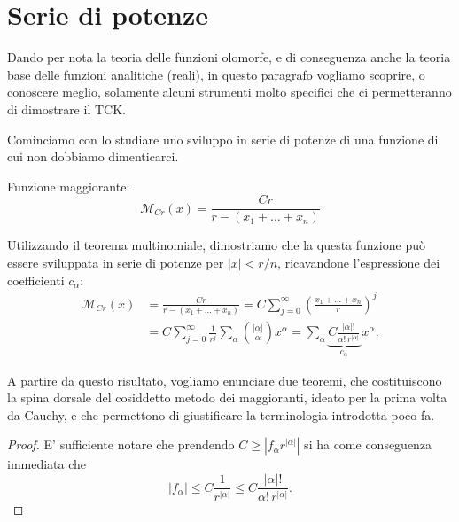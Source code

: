 \newpage
\section{Serie di potenze}\label{seriedipotenze}
Dando per nota la teoria delle funzioni olomorfe, e di conseguenza anche la teoria base delle funzioni analitiche (reali), in questo paragrafo vogliamo scoprire, o conoscere meglio, solamente alcuni strumenti molto specifici che ci permetteranno di dimostrare il TCK.

Cominciamo con lo studiare uno sviluppo in serie di potenze di una funzione di cui non dobbiamo dimenticarci.
\begin{definition}
Funzione maggiorante: $$\mathcal{M}_{Cr}(x)=\frac{Cr}{r-(x_1+\ldots +x_n)}$$
\end{definition}
Utilizzando il teorema multinomiale, dimostriamo che la questa funzione può essere sviluppata in serie di potenze per $|x|<r/n$, ricavandone l'espressione dei coefficienti $c_\alpha$:
\begin{align*}
\mathcal{M}_{Cr}(x) &= \frac{Cr}{r-(x_1+\ldots +x_n)} = C \sum\limits_{j=0}^\infty \left(\frac{x_1+\ldots +x_n}{r}\right)^j  \\
&= C \sum\limits_{j=0}^\infty \frac{1}{r^j} \sum\limits_\alpha  \binom{|\alpha |}{\alpha } x^\alpha = \sum\limits_\alpha 
\underbrace{C \frac{|\alpha |!}{\alpha ! \, r^{|\alpha |}}}_{c_\alpha} \, x^\alpha .
\end{align*}

A partire da questo risultato, vogliamo enunciare due teoremi, che costituiscono la spina dorsale del cosiddetto metodo dei maggioranti, ideato per la prima volta da Cauchy, e che permettono di giustificare la terminologia introdotta poco fa.

\begin{theorem}\label{teomagg}
\end{theorem}


\begin{theorem}\label{costrmagg}
\end{theorem}

\begin{proof}
E' sufficiente notare che prendendo $C \geq |f_\alpha r^{|\alpha |}|$ si ha come conseguenza immediata che
$$|f_\alpha | \leq C \frac{1}{r^{|\alpha |}} \leq C \frac{|\alpha |!}{\alpha ! \, r^{|\alpha |}}.$$
\end{proof}

